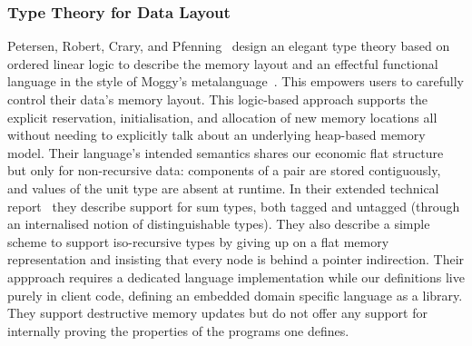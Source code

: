 \subsubsection{Type Theory for Data Layout}

Petersen, Robert, Crary, and Pfenning~\citeyearpar{DBLP:conf/popl/PetersenHCP03}
design an elegant type theory based on ordered linear logic
to describe the memory layout and an effectful functional
language in the style of Moggy's
metalanguage~\citeyearpar{DBLP:journals/iandc/Moggi91}.
This empowers users to carefully control their data's memory
layout.
%
This logic-based approach supports the explicit reservation,
initialisation, and allocation of new memory locations all
without needing to explicitly talk about an underlying
heap-based memory model.
%
Their language's intended semantics shares our economic flat
structure but only for non-recursive data: components of a
pair are stored contiguously, and values of the unit type are
absent at runtime.
%
In their extended technical report~\citeyearpar{MANUAL:report/cmu/PetersenHCP03}
they describe support for sum types, both tagged and untagged
(through an internalised notion of distinguishable types).
They also describe a simple scheme to support iso-recursive types
by giving up on a flat memory representation and insisting that
every node is behind a pointer indirection.
%
Their appproach requires a dedicated language implementation
while our definitions live purely in client code, defining
an embedded domain specific language as a library.
%
They support destructive memory updates but do not offer any
support for internally proving the properties of the programs
one defines.
